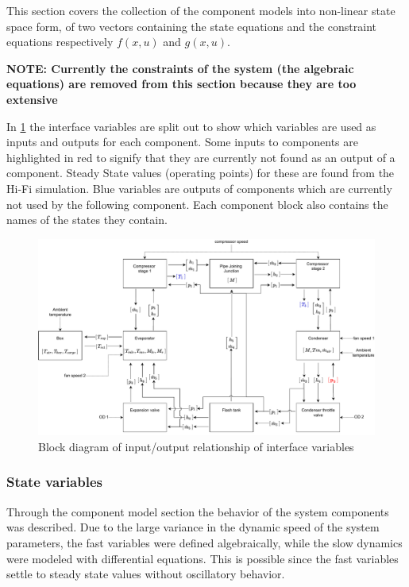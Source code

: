 This section covers the collection of the component models into non-linear state space form, of two vectors containing the state equations and the constraint equations respectively $f(x,u)$ and $ g(x,u) $.


\textbf{NOTE: Currently the constraints of the system (the algebraic equations) are removed from this section because they are too extensive}


In \cref{fig:Block_diagram_inout} the interface variables are split out to show which variables are used as inputs and outputs for each component. Some inputs to components are highlighted in red to signify that they are currently not found as an output of a component. Steady State values (operating points) for these are found from the Hi-Fi simulation. Blue variables are outputs of components which are currently not used by the following component. Each component block also contains the names of the states they contain.

\begin{figure}[h!]
	\centering
	\includegraphics[width=1\textwidth]{Graphics/Block_Diagram_inout.pdf}
	\caption{Block diagram of input/output relationship of interface variables}
	\label{fig:Block_diagram_inout}
\end{figure}


\newpage
\subsubsection{State variables}

Through the component model section the behavior of the system components was described. Due to the large variance in the dynamic speed of the system parameters, the fast variables were defined algebraically, while the slow dynamics were modeled with differential equations. This is possible since the fast variables settle to steady state values without oscillatory behavior. \\

